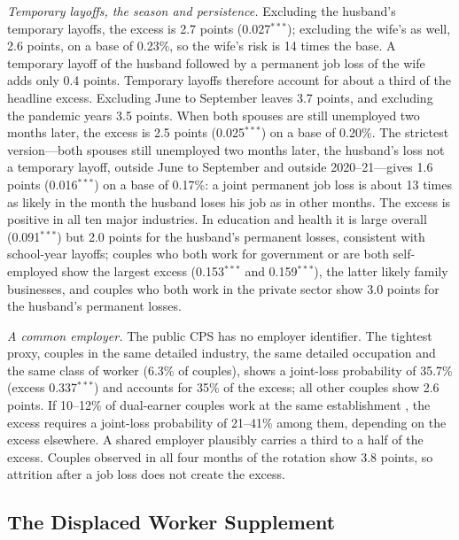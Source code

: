 \emph{Temporary layoffs, the season and persistence.} Excluding the husband's temporary layoffs, the excess is 2.7
points (0.027$^{***}$); excluding the wife's as well, 2.6 points, on a base of 0.23\%, so the wife's risk is 14 times the
base. A temporary layoff of the husband followed by a permanent job loss of the wife adds only 0.4 points. Temporary
layoffs therefore account for about a third of the headline excess. Excluding June to September leaves 3.7 points, and
excluding the pandemic years 3.5 points. When both spouses are still unemployed two months later, the excess is 2.5
points (0.025$^{***}$) on a base of 0.20\%. The strictest version---both spouses still unemployed two months later, the
husband's loss not a temporary layoff, outside June to September and outside 2020--21---gives 1.6 points
(0.016$^{***}$) on a base of 0.17\%: a joint permanent job loss is about 13 times as likely in the month the husband loses
his job as in other months. The excess is positive in all ten major industries. In education and health it is large
overall (0.091$^{***}$) but 2.0 points for the husband's permanent losses, consistent with school-year layoffs; couples
who both work for government or are both self-employed show the largest excess (0.153$^{***}$ and 0.159$^{***}$), the
latter likely family businesses, and couples who both work in the private sector show 3.0 points for the husband's
permanent losses.

\emph{A common employer.} The public CPS has no employer identifier. The tightest proxy, couples in the same detailed
industry, the same detailed occupation and the same class of worker (6.3\% of couples), shows a joint-loss probability
of 35.7\% (excess 0.337$^{***}$) and accounts for 35\% of the excess; all other couples show 2.6 points. If 10--12\% of
dual-earner couples work at the same establishment \citep{hyatt2019coworking}, the excess requires a joint-loss
probability of 21--41\% among them, depending on the excess elsewhere. A shared employer plausibly carries a third to a
half of the excess. Couples observed in all four months of the rotation show 3.8 points, so attrition after a job loss
does not create the excess.



\subsection{The Displaced Worker Supplement}

